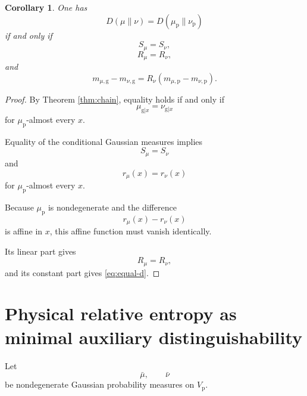 \documentclass[11pt]{article}
\newtheorem{corollary}[theorem]{Corollary}
\theoremstyle{remark}
\begin{document}
\begin{corollary}
\label{cor:equality}
One has
\begin{equation}
D(\mu\|\nu)
=
D(\mu_{\mathrm p}\|\nu_{\mathrm p})
\label{eq:no-loss}
\end{equation}
if and only if
\begin{equation}
S_\mu=S_\nu,
\label{eq:equal-S}
\end{equation}
\begin{equation}
R_\mu=R_\nu,
\label{eq:equal-R}
\end{equation}
and
\begin{equation}
m_{\mu,\mathrm g}
-
m_{\nu,\mathrm g}
=
R_\nu
\left(
m_{\mu,\mathrm p}
-
m_{\nu,\mathrm p}
\right).
\label{eq:equal-d}
\end{equation}
\end{corollary}

\begin{proof}
By Theorem \ref{thm:chain}, equality holds if and only if
\begin{equation}
\mu_{\mathrm g|x}
=
\nu_{\mathrm g|x}
\end{equation}
for \(\mu_{\mathrm p}\)-almost every \(x\).

Equality of the conditional Gaussian measures implies
\begin{equation}
S_\mu=S_\nu
\end{equation}
and
\begin{equation}
r_\mu(x)=r_\nu(x)
\end{equation}
for \(\mu_{\mathrm p}\)-almost every \(x\).

Because \(\mu_{\mathrm p}\) is nondegenerate and the
difference
\begin{equation}
r_\mu(x)-r_\nu(x)
\end{equation}
is affine in \(x\), this affine function must vanish
identically.

Its linear part gives
\begin{equation}
R_\mu=R_\nu,
\end{equation}
and its constant part gives
\eqref{eq:equal-d}.
\end{proof}

\section{Physical relative entropy as minimal auxiliary
distinguishability}

Let
\begin{equation}
\bar\mu,
\qquad
\bar\nu
\end{equation}
be nondegenerate Gaussian probability measures on
\(V_{\mathrm p}\).
\end{document}
